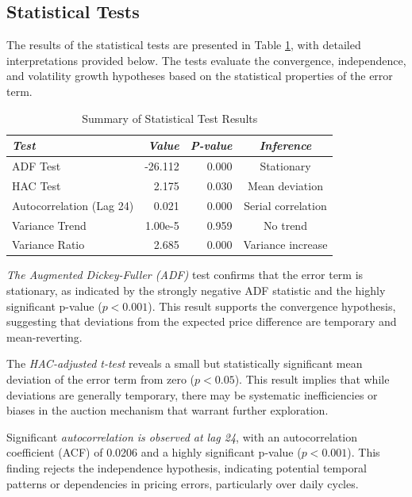 \documentclass[12pt]{article}
\begin{document}
\subsection{Statistical Tests}

The results of the statistical tests are presented in Table \ref{tab:test_results}, with detailed interpretations provided below. The tests evaluate the convergence, independence, and volatility growth hypotheses based on the statistical properties of the error term.

\begin{table}[ht]
   \footnotesize
   \centering
   \caption{Summary of Statistical Test Results}
   \label{tab:test_results}
   \begin{tabular}{lrrc}
       \hline
       \textit{Test} & \textit{Value} & \textit{P-value} & \textit{Inference} \\
       \hline
       ADF Test & -26.112 & 0.000 & Stationary \\
       HAC Test & 2.175 & 0.030 & Mean deviation \\
       Autocorrelation (Lag 24) & 0.021 & 0.000 & Serial correlation \\
       Variance Trend & 1.00e-5 & 0.959 & No trend \\
       Variance Ratio & 2.685 & 0.000 & Variance increase \\
       \hline
   \end{tabular}
\end{table}

\textit{The Augmented Dickey-Fuller (ADF)} test confirms that the error term is stationary, as indicated by the strongly negative ADF statistic and the highly significant p-value ($p < 0.001$). This result supports the convergence hypothesis, suggesting that deviations from the expected price difference are temporary and mean-reverting.

The \textit{HAC-adjusted t-test} reveals a small but statistically significant mean deviation of the error term from zero ($p < 0.05$). This result implies that while deviations are generally temporary, there may be systematic inefficiencies or biases in the auction mechanism that warrant further exploration.

Significant \textit{autocorrelation is observed at lag 24}, with an autocorrelation coefficient (ACF) of 0.0206 and a highly significant p-value ($p < 0.001$). This finding rejects the independence hypothesis, indicating potential temporal patterns or dependencies in pricing errors, particularly over daily cycles.
\end{document}
